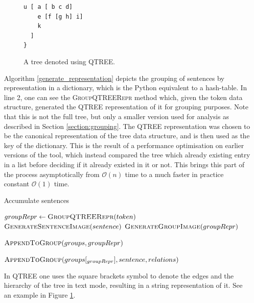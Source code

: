 \documentclass[11pt,a4paper,openright]{memoir}
\begin{document}
\begin{figure}[!htbp]

\begin{verbatim}
u [ a [ b c d]
    e [f [g h] i]
    k 
  ]
}
\end{verbatim}

  \caption[A tree denoted using QTREE.]{A tree denoted using QTREE.}
  \label{fig:qtree_lang}
\end{figure}


Algorithm \ref{generate_representation} depicts the grouping of sentences by representation in a dictionary, which is the Python equivalent to a hash-table. In line 2, one can see the \textsc{GroupQTREERepr} method which, given the token data structure, generated the QTREE \cite{qtree} representation of it for grouping purposes. Note that this is not the full tree, but only a smaller version used for analysis as described in Section \ref{section:grouping}. The QTREE representation was chosen to be the canonical representation of the tree data structure, and is then used as the key of the dictionary. This is the result of a performance optimisation on earlier versions of the tool, which instead compared the tree which already existing entry in a list before deciding if it already existed in it or not. This brings this part of the process asymptotically from $\mathcal{O}(n)$ time to a much faster in practice constant $\mathcal{O}(1)$ time.

\begin{algorithm}[t]
  \caption{Accumulate sentences}\label{generate_representation}
  \begin{algorithmic}[1]
    
    		\State $groupRepr\gets \Call{GroupQTREERepr}{token}$ 
    		\State $\Call{GenerateSentenceImage}{sentence}$
    		\State $\Call{GenerateGroupImage}{groupRepr}$
    		
    			\State $\Call{AppendToGroup}{groups, groupRepr}$
    		\EndIf
    		
    		\State $\Call{AppendToGroup}{groups[_{groupRepr}], sentence, relations}$
    		
    \EndProcedure
    
  \end{algorithmic}
\end{algorithm}


In QTREE one uses the square brackets symbol to denote the edges and the hierarchy of the tree in text mode, resulting in a string representation of it. See an example in Figure \ref{fig:qtree_lang}.
\end{document}
